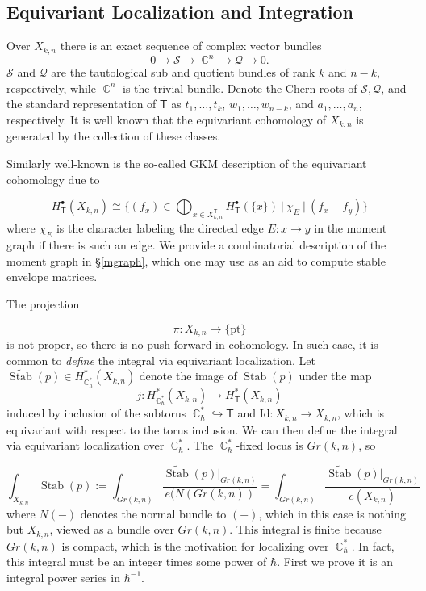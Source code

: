 \documentclass[12 pt]{article}
\theoremstyle{plain}
\theoremstyle{plain}
\theoremstyle{plain}
\theoremstyle{plain}
\theoremstyle{plain}
\theoremstyle{plain}
\theoremstyle{plain}
\theoremstyle{plain}
\theoremstyle{plain}
\theoremstyle{plain}
\theoremstyle{remark}
\theoremstyle{remark}
\theoremstyle{definition}
\theoremstyle{definition}
\theoremstyle{definition}
\theoremstyle{definition}
\theoremstyle{definition}
\theoremstyle{definition}
\DeclareMathOperator{\C}{\mathbb{C}}
\DeclareMathOperator{\Stab}{Stab}
\newcommand{\bT}{\mathsf{T}}
\begin{document}
\subsection{Equivariant Localization and Integration}\label{eq-loc}

Over $X_{k,n}$ there is an exact sequence of complex vector bundles
$$
0\to \mathcal S \to \C^n\to \mathcal Q \to 0.
$$
$\mathcal S$ and $\mathcal Q$ are the tautological sub and quotient bundles of rank $k$ and $n-k$, respectively, while $\C^n$ is the trivial bundle. Denote the Chern roots of $\mathcal S, \mathcal Q$, and the standard representation of $\bT$ as $t_1,\dots,t_k$, $w_1,\dots,w_{n-k}$, and $a_1,\dots,a_n$, respectively.  It is well known that the equivariant cohomology of $X_{k,n}$ is generated by the collection of these classes. 

Similarly well-known is the so-called GKM description of the equivariant cohomology due to \cite{GKM}

\[
H_\bT^\bullet(X_{k,n})\cong\Big\{ (f_x)\in\bigoplus_{x\in X_{k,n}^\bT}H^\bullet_\bT(\{x\})\ \Big|\ \chi_E\ |\ (f_x-f_y) \Big\}
\]
where $\chi_E$ is the character labeling the directed edge $E: x \to y$ in the moment graph if there is such an edge. We provide a combinatorial description of the moment graph in \S\ref{mgraph}, which one may use as an aid to compute stable envelope matrices.

The projection 

$$
\pi: X_{k,n} \to \{\text{pt}\}
$$
is not proper, so there is no push-forward in cohomology. In such case, it is common to \textit{define} the integral via equivariant localization. Let $\widetilde{\Stab}(p)\in H^*_{\C^{*}_{\hbar}}(X_{k,n})$ denote the image of $\Stab(p)$ under the map
\[
j:H^{*}_{\C^{*}_{\hbar}}(X_{k,n})\to H^{*}_{\bT}(X_{k,n})
\]
induced by inclusion of the subtorus $\C^{*}_{\hbar}\hookrightarrow\bT$ and $\text{Id}:X_{k,n}\to X_{k,n}$, which is equivariant with respect to the torus inclusion. We can then define the integral via equivariant localization over $\C^{*}_{\hbar}$. The $\C^{*}_{\hbar}$-fixed locus is $Gr(k,n)$, so 

\begin{equation}\label{stabp-int-def}
\int_{X_{k,n}}\Stab(p):= \int_{Gr(k,n)}\frac{\widetilde{\Stab}(p)|_{Gr(k,n)}}{e(N(Gr(k,n))} = \int_{Gr(k,n)}\frac{\widetilde{\Stab}(p)|_{Gr(k,n)}}{e(X_{k,n})}
\end{equation}
where $N(-)$ denotes the normal bundle to $(-)$, which in this case is nothing but $X_{k,n}$, viewed as a bundle over $Gr(k,n)$. This integral is finite because $Gr(k,n)$ is compact, which is the motivation for localizing over $\C^*_\hbar$. In fact, this integral must be an integer times some power of $\hbar$. First we prove it is an integral power series in $\hbar^{-1}$.
\end{document}

